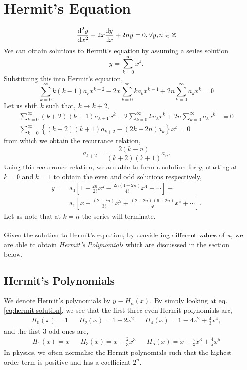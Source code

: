 \documentclass{book}
\begin{document}
\section{Hermit's Equation}
\begin{equation}
	\dv[2]{y}{x} - 2x\dv{y}{x} + 2ny = 0, \forall y, n \in \mathbb{Z}
\end{equation}
We can obtain solutions to Hermit's equation by assuming a series solution,
\begin{equation}
	y = \sum_{k=0}^{\infty}x^k.
\end{equation}
Substituing this into Hermit's equation,
\begin{equation}
	\sum_{k=0}^{\infty}k(k-1)a_kx^{k-2} - 2x\sum_{k=0}^{\infty}ka_kx^{k-1} + 2n\sum_{k=0}^{\infty}a_kx^k = 0
\end{equation}
Let us shift $k$ such that, $k \to k + 2$,
\begin{equation}
	\begin{split}
		\sum_{k=0}^{\infty}(k+2)(k+1)a_{k+1}x^k - 2\sum_{k=0}^{\infty}ka_kx^k + 2n\sum_{k=0}^{\infty}a_kx^k & = 0 \\
		\sum_{k=0}^{\infty}\left\{(k+2)(k+1)a_{k+2} - (2k-2n)a_{k}\right\}x^k = 0
	\end{split}
\end{equation}
from which we obtain the recurrance relation,
\begin{equation}
	a_{k+2} = \frac{2(k-n)}{(k+2)(k+1)}a_n.
\end{equation}
Using this recurrance relation, we are able to form a solution for $y$, starting at $k=0$ and $k=1$ to obtain the even and odd solutions respectively,
\begin{equation}
	\begin{split}
		y = & a_0\left[1 - \frac{2n}{2!}x^2 - \frac{2n(4-2n)}{4!}x^4 + \cdots\right] + \\
		& a_1\left[x + \frac{(2-2n)}{3!}x^3 + \frac{(2-2n)(6-2n)}{5!}x^5 + \cdots\right]. \label{eq:hermit solution} 
	\end{split}
\end{equation}
Let us note that at $k=n$ the series will terminate.
\\\\
Given the solution to Hermit's equation, by considering different values of $n$, we are able to obtain \textit{Hermit's Polynomials} which are discusssed in the section below.
\subsection{Hermit's Polynomials}
We denote Hermit's polynomials by $y \equiv H_n(x)$. By simply looking at eq. \eqref{eq:hermit solution}, we see that the first three even Hermit polynomials are,
\begin{align}
	H_0(x) = 1 && H_2(x) = 1 - 2x^2 && H_4(x) = 1 - 4x^2 + \frac{4}{3}x^4,
\end{align}
and the first 3 odd ones are,
\begin{align}
	H_1(x) = x && H_3(x) = x - \frac{2}{3}x^3 && H_5(x) = x - \frac{4}{3}x^3 + \frac{4}{5}x^5
\end{align}
In physics, we often normalise the Hermit polynomials such that the highest order term is positive and has a coefficient $2^n$.
\end{document}

